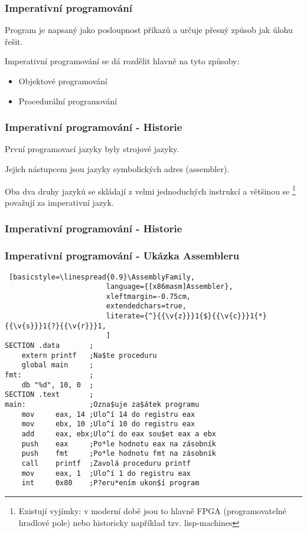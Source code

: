 \begin{frame}
    \frametitle{Imperativní programování}
    Program je napsaný jako posloupnost příkazů a určuje přesný způsob jak úlohu řešit. %

    Imperativní programování se dá rozdělit hlavně na tyto způsoby: 
    \begin{itemize}
        \item Objektové programování
        \item Procedurální programování
    \end{itemize}

    
\end{frame}

\begin{frame}[fragile]
    \frametitle{Imperativní programování - Historie}
    První programovací jazyky byly strojové jazyky. 

    Jejich nástupcem jsou jazyky symbolických adres (assembler). %
    
    Oba dva druhy jazyků se skládají z velmi jednoduchých instrukcí a většinou se
    \footnote{Existují vyjímky: v moderní době jsou to hlavně FPGA (programovatelné hradlové pole) nebo historicky například tzv. lisp-machines} považují za imperativní jazyk.
\end{frame}


\begin{frame}[fragile]
    \frametitle{Imperativní programování - Historie} %
\end{frame}

\begin{frame}[fragile]
    \frametitle{Imperativní programování - Ukázka Assembleru}

    \newfontfamily{}
    \begin{lstlisting} [basicstyle=\linespread{0.9}\AssemblyFamily,
                        language={[x86masm]Assembler},
                        xleftmargin=-0.75cm,
                        extendedchars=true,
                        literate={^}{{\v{z}}}1{$}{{\v{c}}}1{*}{{\v{s}}}1{?}{{\v{r}}}1,
                        ]
SECTION .data       ;
    extern printf   ;Na$te proceduru
    global main     ;
fmt:                ;
    db "%d", 10, 0  ;
SECTION .text       ;
main:               ;Ozna$uje za$átek programu
    mov     eax, 14 ;Ulo^í 14 do registru eax
    mov     ebx, 10 ;Ulo^í 10 do registru eax
    add     eax, ebx;Ulo^í do eax sou$et eax a ebx 
    push    eax     ;Po*le hodnotu eax na zásobník
    push    fmt     ;Po*le hodnotu fmt na zásobník
    call    printf  ;Zavolá proceduru printf
    mov     eax, 1  ;Ulo^í 1 do registru eax
    int     0x80    ;P?eru*ením ukon$í program
    \end{lstlisting}
\end{frame}


